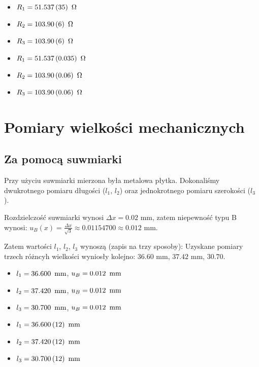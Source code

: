 \documentclass[a4paper]{article}
\begin{document}
\begin{itemize}
\item $R_1 = 51.537 \, (35) \enskip \Omega$
\item $R_2 = 103.90 \, (6) \enskip \Omega$
\item $R_3 = 103.90 \, (6) \enskip \Omega$
\end{itemize}

\begin{itemize}
\item $R_1 = 51.537 \, (0.035) \enskip \Omega$
\item $R_2 = 103.90 \, (0.06) \enskip \Omega$
\item $R_3 = 103.90 \, (0.06) \enskip \Omega$
\end{itemize}

\section{Pomiary wielkości mechanicznych}

\subsection{Za pomocą suwmiarki}

Przy użyciu suwmiarki mierzona była metalowa płytka.
Dokonaliśmy dwukrotnego pomiaru długości ($l_1$, $l_2$) oraz jednokrotnego pomiaru szerokości ($l_3$).

Rozdzielczość suwmiarki wynosi $\Delta x = 0.02$ mm, zatem niepewność typu B wynosi: $u_B(x) = \frac{\Delta x}{\sqrt{3}} \approx 0.01154700 \approx 0.012$ mm.

Zatem wartości $l_1$, $l_2$, $l_3$ wynoszą (zapis na trzy sposoby):
Uzyskane pomiary trzech różncyh wielkości wyniosły kolejno: $36.60$ mm, $37.42$ mm, $30.70$.

\begin{itemize}
\item $l_1 = 36.600 \enskip \text{mm}$, $u_B = 0.012 \enskip \text{mm}$
\item $l_2 = 37.420 \enskip \text{mm}$, $u_B = 0.012 \enskip \text{mm}$
\item $l_3 = 30.700 \enskip \text{mm}$, $u_B = 0.012 \enskip \text{mm}$
\end{itemize}

\begin{itemize}
\item $l_1 = 36.600 \, (12) \enskip \text{mm}$
\item $l_2 = 37.420 \, (12) \enskip \text{mm}$
\item $l_3 = 30.700 \, (12) \enskip \text{mm}$
\end{itemize}
\end{document}
